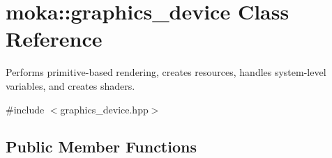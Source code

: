 \hypertarget{classmoka_1_1graphics__device}{}\section{moka\+::graphics\+\_\+device Class Reference}
\label{classmoka_1_1graphics__device}


Performs primitive-\/based rendering, creates resources, handles system-\/level variables, and creates shaders.  




{\ttfamily \#include $<$graphics\+\_\+device.\+hpp$>$}

\subsection*{Public Member Functions}
